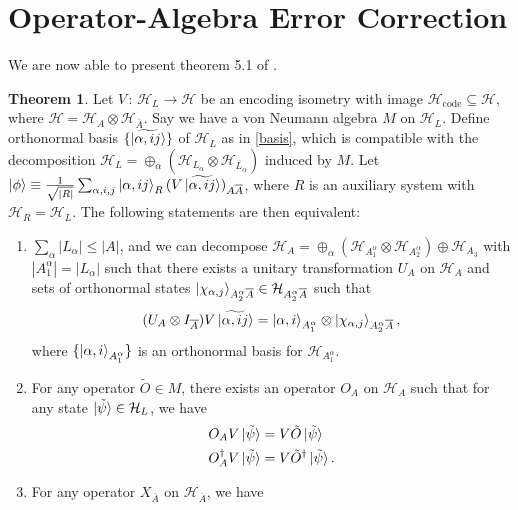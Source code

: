 \documentclass[12pt,a4paper]{report}
\numberwithin{equation}{section}
\newcommand{\Hcode}{\mathcal{H}_{\text{code}}}
\newcommand{\ol}[1]{\overline{#1}}
\theoremstyle{definition}
\theoremstyle{theorem}
\newtheorem{theorem}{Theorem}[section]
\theoremstyle{theorem}
\theoremstyle{example}
\theoremstyle{definition}
\begin{document}
\section{Operator-Algebra Error Correction}
We are now able to present theorem 5.1 of \cite{Harlow}.
\begin{theorem}\label{5.1}
	Let $V\,:\,\mathcal{H}_{L}\to \mathcal{H}$ be an encoding isometry with image $\Hcode\subseteq\mathcal{H}$, where $\mathcal{H}=\mathcal{H}_{A}\otimes\mathcal{H}_{\ol{A}}$. Say we have a von Neumann algebra $M$ on $\mathcal{H}_{L}$. Define orthonormal basis $\{\ket{\widetilde{\alpha,ij}}\}$ of $\mathcal{H}_{L}$ as in \ref{basis}, which is compatible with the decomposition $\mathcal{H}_{L}=\oplus_{\alpha}(\mathcal{H}_{L_{\alpha}}\otimes\mathcal{H}_{\ol{L}_{\alpha}})$ induced by $M$. Let $\ket{\phi}\equiv\frac{1}{\sqrt{|R|}}\sum_{\alpha,i,j}\ket{\alpha,ij}_{R}(V\ket{\widetilde{\alpha,ij}})_{A\ol{A}}$, where $R$ is an auxiliary system with $\mathcal{H}_{R}=\mathcal{H}_{L}$. The following statements are then equivalent:
	\begin{enumerate}
		\item $\sum_{\alpha}|L_{\alpha}|\leq|A|$, and we can decompose $\mathcal{H}_{A}=\oplus_{\alpha}(\mathcal{H}_{A_{1}^{\alpha}}\otimes\mathcal{H}_{A_{2}^{\alpha}})\oplus\mathcal{H}_{A_{3}}$ with $|A_{1}^{\alpha}|=|L_{\alpha}|$ such that there exists a unitary transformation $U_{A}$ on $\mathcal{H}_{A}$ and sets of orthonormal states $\ket{\chi_{\alpha,j}}_{A_{2}^{\alpha}\ol{A}}\in\mathcal{H}_{A_{2}^{\alpha}\ol{A}}$ such that
		\begin{equation}\label{O1}
			(U_{A}\otimes I_{\ol{A}})V\ket{\widetilde{\alpha,ij}}=\ket{\alpha,i}_{A_{1}^{\alpha}}\otimes\ket{\chi_{\alpha,j}}_{A_{2}^{\alpha}\ol{A}},
		\end{equation}
		where $\{\ket{\alpha,i}_{A_{1}^{\alpha}}\}$ is an orthonormal basis for $\mathcal{H}_{A_{1}^{\alpha}}$.
		\item For any operator $\tilde{O}\in M$, there exists an operator $O_{A}$ on $\mathcal{H}_{A}$ such that for any state $\ket{\tilde{\psi}}\in\mathcal{H}_{L}$, we have
		\begin{equation}\label{O2}
			\begin{aligned}
				O_{A}V\ket{\tilde{\psi}}&=V\tilde{O}\ket{\tilde{\psi}}\\
				O_{A}^{\dagger}V\ket{\tilde{\psi}}&=V\tilde{O}^{\dagger}\ket{\tilde{\psi}}.
			\end{aligned}
		\end{equation}
		\item For any operator $X_{\ol{A}}$ on $\mathcal{H}_{\ol{A}}$, we have

\end{enumerate}
\end{theorem}
\end{document}
